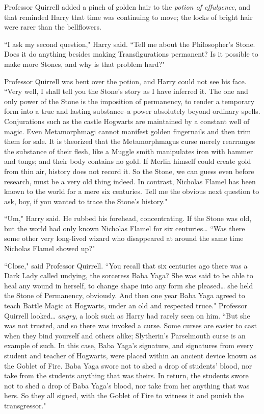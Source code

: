 Professor Quirrell added a pinch of golden hair to the \emph{potion of effulgence}, and that reminded Harry that time was continuing to move; the locks of bright hair were rarer than the bellflowers.

``I ask my second question," Harry said. ``Tell me about the Philosopher's Stone. Does it do anything besides making Transfigurations permanent? Is it possible to make more Stones, and why is that problem hard?"

Professor Quirrell was bent over the potion, and Harry could not see his face. ``Very well, I shall tell you the Stone's story as I have inferred it. The one and only power of the Stone is the imposition of permanency, to render a temporary form into a true and lasting substance\---a power absolutely beyond ordinary spells. Conjurations such as the castle Hogwarts are maintained by a constant well of magic. Even Metamorphmagi cannot manifest golden fingernails and then trim them for sale. It is theorized that the Metamorphmagus curse merely rearranges the substance of their flesh, like a Muggle smith manipulates iron with hammer and tongs; and their body contains no gold. If Merlin himself could create gold from thin air, history does not record it. So the Stone, we can guess even before research, must be a very old thing indeed. In contrast, Nicholas Flamel has been known to the world for a mere six centuries. Tell me the obvious next question to ask, boy, if you wanted to trace the Stone's history."

``Um," Harry said. He rubbed his forehead, concentrating. If the Stone was old, but the world had only known Nicholas Flamel for six centuries{\ldots} ``Was there some other very long-lived wizard who disappeared at around the same time Nicholas Flamel showed up?"

``Close," said Professor Quirrell. ``You recall that six centuries ago there was a Dark Lady called undying, the sorceress Baba Yaga? She was said to be able to heal any wound in herself, to change shape into any form she pleased{\ldots} she held the Stone of Permanency, obviously. And then one year Baba Yaga agreed to teach Battle Magic at Hogwarts, under an old and respected truce." Professor Quirrell looked{\ldots} \emph{angry}, a look such as Harry had rarely seen on him. ``But she was not trusted, and so there was invoked a curse. Some curses are easier to cast when they bind yourself and others alike; Slytherin's Parselmouth curse is an example of such. In this case, Baba Yaga's signature, and signatures from every student and teacher of Hogwarts, were placed within an ancient device known as the Goblet of Fire. Baba Yaga swore not to shed a drop of students' blood, nor take from the students anything that was theirs. In return, the students swore not to shed a drop of Baba Yaga's blood, nor take from her anything that was hers. So they all signed, with the Goblet of Fire to witness it and punish the transgressor."

